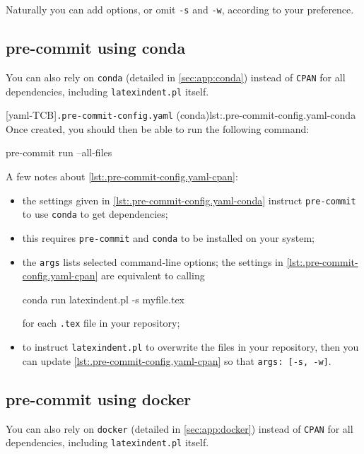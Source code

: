   Naturally you can add options, or omit \texttt{-s} and \texttt{-w}, according to your
  preference.

 \subsection{pre-commit using conda}\label{sec:pre-commit-conda}

  You can also rely on \texttt{conda} (detailed in \cref{sec:app:conda}) instead of
  \texttt{CPAN} for all dependencies, including \texttt{latexindent.pl} itself.
    

  [yaml-TCB]{\texttt{.pre-commit-config.yaml} (conda)}{lst:.pre-commit-config.yaml-conda}
  Once created, you should then be able to run the following command:
  \begin{commandshell}
pre-commit run --all-files  
\end{commandshell}
  A few notes about \cref{lst:.pre-commit-config.yaml-cpan}:
  \begin{itemize}
   \item the settings given in \cref{lst:.pre-commit-config.yaml-conda} instruct
         \texttt{pre-commit} to use \texttt{conda} to get dependencies;
   \item this requires \texttt{pre-commit} and \texttt{conda} to be installed on your system;
   \item the \texttt{args} lists selected command-line options; the settings in
         \cref{lst:.pre-commit-config.yaml-cpan} are equivalent to calling
         \begin{commandshell}
conda run latexindent.pl -s myfile.tex       
\end{commandshell}
         for each \texttt{.tex} file in your repository;
   \item to instruct \texttt{latexindent.pl} to overwrite the files in your repository, then you
         can update \cref{lst:.pre-commit-config.yaml-cpan} so that \texttt{args: [-s, -w]}.
  \end{itemize}

  \subsection{pre-commit using docker}\label{sec:pre-commit-docker}

  You can also rely on \texttt{docker} (detailed in \cref{sec:app:docker}) instead of
  \texttt{CPAN} for all dependencies, including \texttt{latexindent.pl} itself.
    

